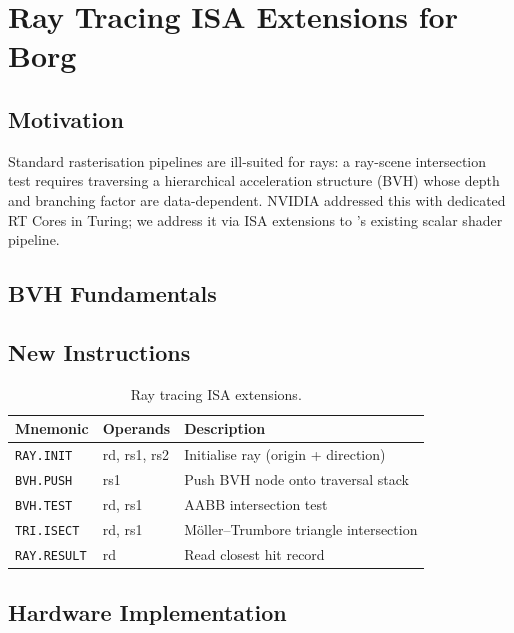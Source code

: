 \chapter{Ray Tracing ISA Extensions for Borg}
\label{chap:isa}

\section{Motivation}

Standard rasterisation pipelines are ill-suited for rays:
a ray-scene intersection test requires traversing a hierarchical
acceleration structure (BVH) whose depth and branching factor are
data-dependent.
NVIDIA addressed this with dedicated RT Cores in Turing; we address it
via ISA extensions to \borg{}'s existing scalar shader pipeline.

\section{BVH Fundamentals}


\section{New Instructions}

\begin{table}[h]
  \centering
  \begin{tabular}{lll}
    \toprule
    Mnemonic & Operands & Description \\
    \midrule
    \texttt{RAY.INIT}   & rd, rs1, rs2 & Initialise ray (origin + direction) \\
    \texttt{BVH.PUSH}   & rs1          & Push BVH node onto traversal stack  \\
    \texttt{BVH.TEST}   & rd, rs1      & AABB intersection test              \\
    \texttt{TRI.ISECT}  & rd, rs1      & Möller–Trumbore triangle intersection \\
    \texttt{RAY.RESULT} & rd           & Read closest hit record             \\
    \bottomrule
  \end{tabular}
  \caption{Ray tracing ISA extensions.}
  \label{tab:isa_rt}
\end{table}

\section{Hardware Implementation}

